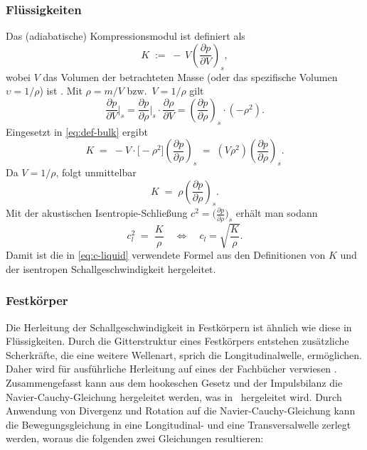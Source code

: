\subsubsection*{Flüssigkeiten}

Das (adiabatische) Kompressionsmodul ist definiert als
\begin{equation}
  K \;:=\; -\,V\left(\frac{\partial p}{\partial V}\right)_{s},
  \label{eq:def-bulk}
\end{equation}
wobei $V$ das Volumen der betrachteten Masse (oder das spezifische Volumen $\upsilon=1/\rho$)
ist \cite{schall:will}.
Mit $\rho = m/V$ bzw.\ $V=1/\rho$ gilt
\[
    \frac{\partial p}{\partial V}\bigg|_s
    = \frac{\partial p}{\partial \rho}\bigg|_s \cdot \frac{\partial \rho}{\partial V}
    = \left(\frac{\partial p}{\partial \rho}\right)_{s}\cdot(-\rho^{2}).
\]
Eingesetzt in \eqref{eq:def-bulk} ergibt
\[
    K \;=\; -V \cdot \big[-\rho^{2}\big]\left(\frac{\partial p}{\partial \rho}\right)_{s}
    \;=\; (V\rho^{2})\left(\frac{\partial p}{\partial \rho}\right)_{s}.
\]
Da $V=1/\rho$, folgt unmittelbar
\begin{equation}
    K \;=\; \rho\left(\frac{\partial p}{\partial \rho}\right)_{s}.
\end{equation}
Mit der akustischen Isentropie-Schließung $c^2=\big(\frac{\partial p}{\partial \rho}\big)_s$
erhält man sodann
\begin{equation}
    c_l^2 \;=\; \frac{K}{\rho} \quad \Leftrightarrow \quad c_l=\sqrt{\frac{K}{\rho}}.
\end{equation}
Damit ist die in \eqref{eq:c-liquid} verwendete Formel aus den Definitionen von $K$
und der isentropen Schallgeschwindigkeit hergeleitet.

\subsubsection*{Festkörper}
Die Herleitung der Schallgeschwindigkeit in Festkörpern ist ähnlich wie diese
in Flüssigkeiten. Durch die Gitterstruktur eines Festkörpers entstehen
zusätzliche Scherkräfte, die eine weitere Wellenart, sprich die
Longitudinalwelle, ermöglichen. Daher wird für ausführliche Herleitung
auf eines der Fachbücher verwiesen \cite{schall:landaulifschitz,schall:gurtin}.
Zusammengefasst kann aus dem hookeschen Gesetz und der Impulsbilanz
die Navier-Cauchy-Gleichung hergeleitet werden, was in~\cite{openfoam:navierstokes}
hergeleitet wird.
Durch Anwendung von Divergenz und Rotation auf die Navier-Cauchy-Gleichung
kann die Bewegungsgleichung in eine Longitudinal- und eine Transversalwelle
zerlegt werden, woraus die folgenden zwei Gleichungen resultieren:

